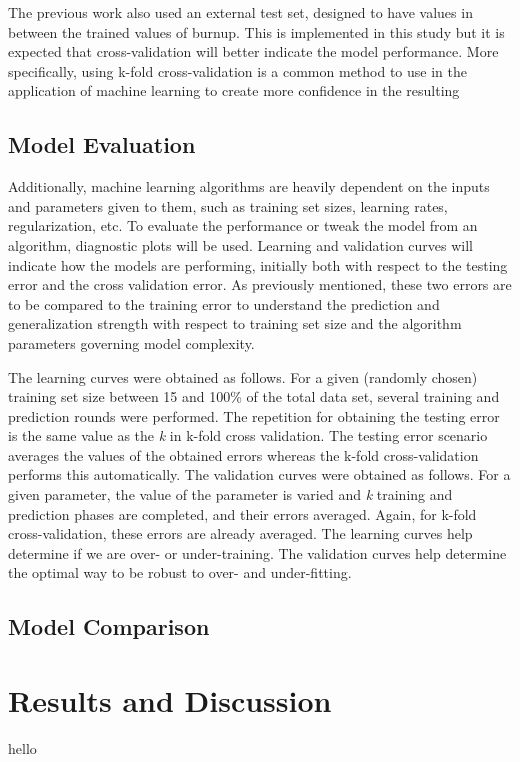 \documentclass{anstrans}
\begin{document}
The previous work also used an external test set, designed to have values in
between the trained values of burnup. This is implemented in this study but it
is expected that cross-validation will better indicate the model performance.
More specifically, using k-fold cross-validation is a common method to use in
the application of machine learning to create more confidence in the resulting

\subsection{Model Evaluation}
Additionally, machine learning algorithms are heavily dependent on the inputs
and parameters given to them, such as training set sizes, learning rates,
regularization, etc. To evaluate the performance or tweak the model from an
algorithm, diagnostic plots will be used. Learning and validation curves will
indicate how the models are performing, initially both with respect to the
testing error and the cross validation error. As previously mentioned, these
two errors are to be compared to the training error to understand the
prediction and generalization strength with respect to training set size and
the algorithm parameters governing model complexity. 

The learning curves were obtained as follows. For a given (randomly chosen)
training set size between 15 and 100\% of the total data set, several training
and prediction rounds were performed. The repetition for obtaining the testing
error is the same value as the \textit{k} in k-fold cross validation. The
testing error scenario averages the values of the obtained errors whereas the
k-fold cross-validation performs this automatically.  The validation curves
were obtained as follows. For a given parameter, the value of the parameter is
varied and \textit{k} training and prediction phases are completed, and their
errors averaged. Again, for k-fold cross-validation, these errors are already
averaged. The learning curves help determine if we are over- or under-training.
The validation curves help determine the optimal way to be robust to over- and
under-fitting. 

\subsection{Model Comparison}

\section{Results and Discussion}
hello
\end{document}
